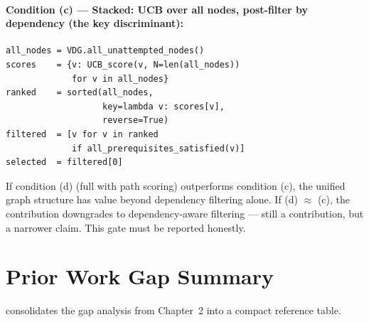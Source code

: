 \paragraph{Condition (c) — Stacked: UCB over all nodes, post-filter by dependency (the key discriminant):}
\begin{verbatim}
all_nodes = VDG.all_unattempted_nodes()
scores    = {v: UCB_score(v, N=len(all_nodes))
             for v in all_nodes}
ranked    = sorted(all_nodes,
                   key=lambda v: scores[v],
                   reverse=True)
filtered  = [v for v in ranked
             if all_prerequisites_satisfied(v)]
selected  = filtered[0]
\end{verbatim}

\noindent If condition (d) (full \vdg{} with path scoring) outperforms condition (c), the unified graph structure has value beyond dependency filtering alone. If (d) $\approx$ (c), the contribution downgrades to dependency-aware \ucb{} filtering — still a contribution, but a narrower claim. This gate must be reported honestly.

\section{Prior Work Gap Summary}
\label{app:prior-work}

 consolidates the gap analysis from Chapter~2 into a compact reference table.

